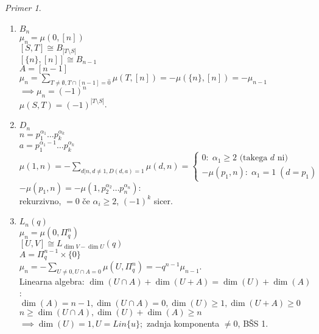 \documentclass[a4paper, 12pt]{book}
\theoremstyle{definition}
\theoremstyle{remark}
\newtheorem*{ex}{Primer}
\begin{document}
\begin{ex} \text{} \\
  \begin{enumerate}[label=(\alph*)]
    \item $B_n$ \\
      $\mu_n = \mu(0, [n])$ \\
      $[S, T] \cong B_{|T \setminus S|}$ \\
      $\left[\{n\}, [n]\right] \cong B_{n-1}$ \\
      $A = [n-1]$ \\
      $\mu_n = \sum_{T \neq \emptyset, T \cap [n-1] = \hat{0}} \mu(T, [n])
      = -\mu(\{n\}, [n]) = -\mu_{n-1}$ \\
      $\implies \mu_n = (-1)^n$ \\
      $\mu(S, T) = (-1)^{|T \setminus S|}$.
    \item $D_n$ \\
      $n = p_1^{\alpha_1} \dots p_k^{\alpha_k}$ \\
      $a = p_1^{\alpha_1 - 1} \dots p_k^{\alpha_k}$ \\
      $\mu(1, n) = -\sum_{d | n, d \neq 1, D(d,a) = 1} \mu(d, n) = \begin{cases}
        0: \; \alpha_1 \geq 2 \text{ (takega $d$ ni)} \\
        -\mu(p_1, n): \; \alpha_1 = 1 \; (d = p_1)
      \end{cases}$ \\
      $-\mu(p_1, n) = -\mu(1, p_2^{\alpha_2} \dots p_n^{\alpha_n})$: \\
      rekurzivno, $=0$ če $\alpha_i \geq 2$, $(-1)^k$ sicer.
    \item $L_n(q)$ \\
      $\mu_n = \mu(0, \Pi_q^n)$ \\
      $[U, V] \cong L_{\dim V - \dim U}(q)$ \\
      $A = \Pi_q^{n-1} \times \{0\}$ \\
      $\mu_n = -\sum_{U \neq 0, U \cap A = 0} \mu(U, \Pi_q^n) = - q^{n-1} \mu_{n-1}$. \\
      Linearna algebra: $\dim (U \cap A) + \dim (U + A) = \dim (U) + \dim(A)$: \\
      $\dim(A) = n-1, \dim(U \cap A) = 0, \dim(U) \geq 1, \dim(U + A) \geq 0$ \\
      $n \geq \dim(U \cap A), \dim(U) + \dim(A) \geq n$ \\
      $\implies \dim(U) = 1, U = Lin \{u\};$ zadnja komponenta $\neq 0$, BŠS 1. \\

\end{enumerate}
\end{ex}
\end{document}
